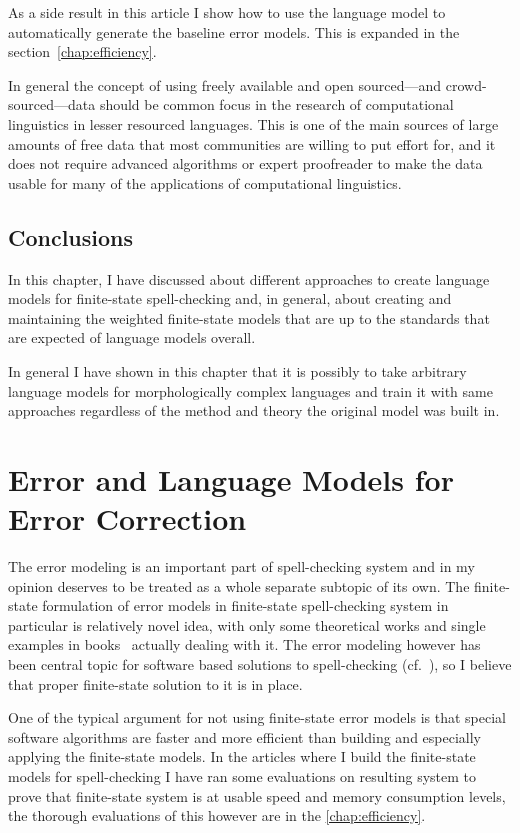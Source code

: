 \documentclass[officiallayout,draft]{unihelcompling}
\begin{document}
As a side result in this article I show how to use the language model to
automatically generate the baseline error models. This is expanded in
the section~\ref{chap:efficiency}.

In general the concept of using freely available and open sourced---and
crowd-sourced---data should be common focus in the research of computational
linguistics in lesser resourced languages. This is one of the main sources of
large amounts of free data that most communities are willing to put effort for,
and it does not require advanced algorithms or expert proofreader to make the
data usable for many of the applications of computational linguistics.

\section{Conclusions}

In this chapter, I have discussed about different approaches to create language
models for finite-state spell-checking and, in general, about creating and
maintaining the weighted finite-state models that are up to the standards that
are expected of language models overall. 

In general I have shown in this chapter that it is possibly to take arbitrary
language models for morphologically complex languages and train it with same
approaches regardless of the method and theory the original model was built in.


\chapter{Error and Language Models for Error Correction}
\label{chap:error-models}

The error modeling is an important part of spell-checking system and in my
opinion deserves to be treated as a whole separate subtopic of its own. The
finite-state formulation of error models in finite-state spell-checking system
in particular is relatively novel idea, with only some theoretical works
\cite{agata2002typographical,mohri2003edit} and single examples in
books~\cite{beesley2003finite} actually dealing with it. The error modeling
however has been central topic for software based solutions to spell-checking
(cf.~\cite{kukich1992spelling,mitton2009ordering,deorowicz2005correcting}), so
I believe that proper finite-state solution to it is in place.

One of the typical argument for not using finite-state error models is that
special software algorithms are faster and more efficient than building and
especially applying the finite-state models. In the articles where I build
the finite-state models for spell-checking I have ran some evaluations on
resulting system to prove that finite-state system is at usable speed
and memory consumption levels, the thorough evaluations of this however
are in the \ref{chap:efficiency}.
\end{document}
